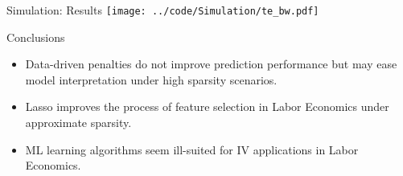 \documentclass[serif,professionalfont]{beamer}
\begin{document}
\begin{frame}{Simulation: Results}
	\texttt{[image: ../code/Simulation/te\_bw.pdf]}	
\end{frame}

\begin{frame} {Conclusions}
\begin{itemize}
\item Data-driven penalties do not improve prediction performance but may ease model interpretation under high sparsity scenarios.
\item Lasso improves the process of feature selection in Labor Economics under approximate sparsity.  
\item ML learning algorithms seem  ill-suited for IV applications in Labor Economics.
\end{itemize}
\end{frame}
\end{document}
